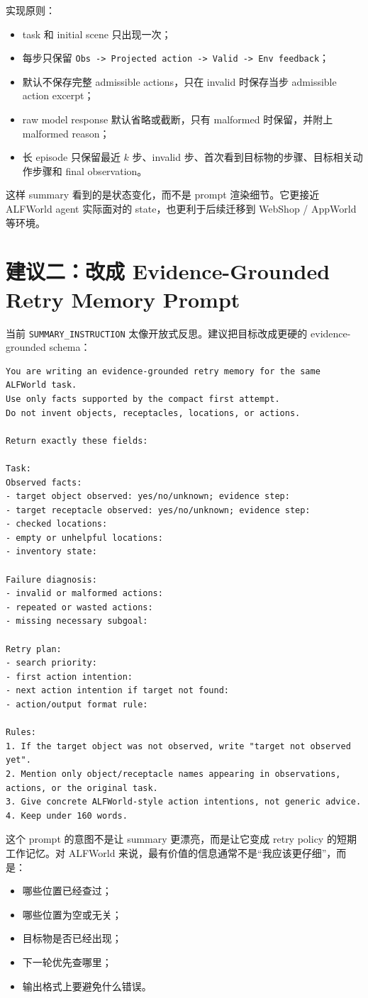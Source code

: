 \documentclass[10pt]{ctexart}
\begin{document}
实现原则：
\begin{itemize}
  \item task 和 initial scene 只出现一次；
  \item 每步只保留 \texttt{Obs -> Projected action -> Valid -> Env feedback}；
  \item 默认不保存完整 admissible actions，只在 invalid 时保存当步 admissible action excerpt；
  \item raw model response 默认省略或截断，只有 malformed 时保留，并附上 malformed reason；
  \item 长 episode 只保留最近 $k$ 步、invalid 步、首次看到目标物的步骤、目标相关动作步骤和 final observation。
\end{itemize}

这样 summary 看到的是状态变化，而不是 prompt 渲染细节。它更接近 ALFWorld agent 实际面对的 state，也更利于后续迁移到 WebShop / AppWorld 等环境。

\section{建议二：改成 Evidence-Grounded Retry Memory Prompt}
当前 \texttt{SUMMARY\_INSTRUCTION} 太像开放式反思。建议把目标改成更硬的 evidence-grounded schema：
\begin{lstlisting}
You are writing an evidence-grounded retry memory for the same ALFWorld task.
Use only facts supported by the compact first attempt.
Do not invent objects, receptacles, locations, or actions.

Return exactly these fields:

Task:
Observed facts:
- target object observed: yes/no/unknown; evidence step:
- target receptacle observed: yes/no/unknown; evidence step:
- checked locations:
- empty or unhelpful locations:
- inventory state:

Failure diagnosis:
- invalid or malformed actions:
- repeated or wasted actions:
- missing necessary subgoal:

Retry plan:
- search priority:
- first action intention:
- next action intention if target not found:
- action/output format rule:

Rules:
1. If the target object was not observed, write "target not observed yet".
2. Mention only object/receptacle names appearing in observations, actions, or the original task.
3. Give concrete ALFWorld-style action intentions, not generic advice.
4. Keep under 160 words.
\end{lstlisting}

这个 prompt 的意图不是让 summary 更漂亮，而是让它变成 retry policy 的短期工作记忆。对 ALFWorld 来说，最有价值的信息通常不是“我应该更仔细”，而是：
\begin{itemize}
  \item 哪些位置已经查过；
  \item 哪些位置为空或无关；
  \item 目标物是否已经出现；
  \item 下一轮优先查哪里；
  \item 输出格式上要避免什么错误。
\end{itemize}
\end{document}
